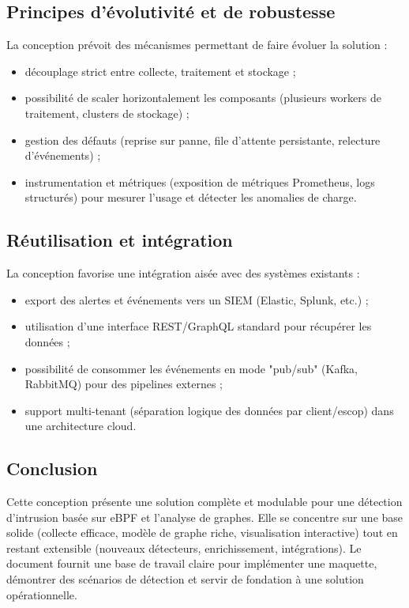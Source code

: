 \documentclass[a4paper,12pt]{article}
\begin{document}
\subsection{Principes d'évolutivité et de robustesse}

La conception prévoit des mécanismes permettant de faire évoluer la solution :

\begin{itemize}
  \item découplage strict entre collecte, traitement et stockage ;
  \item possibilité de scaler horizontalement les composants (plusieurs workers de traitement, clusters de stockage) ;
  \item gestion des défauts (reprise sur panne, file d'attente persistante, relecture d'événements) ;
  \item instrumentation et métriques (exposition de métriques Prometheus, logs structurés) pour mesurer l'usage et détecter les anomalies de charge.
\end{itemize}

\subsection{Réutilisation et intégration}

La conception favorise une intégration aisée avec des systèmes existants :

\begin{itemize}
  \item export des alertes et événements vers un SIEM (Elastic, Splunk, etc.) ;
  \item utilisation d'une interface REST/GraphQL standard pour récupérer les données ;
  \item possibilité de consommer les événements en mode "pub/sub" (Kafka, RabbitMQ) pour des pipelines externes ;
  \item support multi-tenant (séparation logique des données par client/escop) dans une architecture cloud.
\end{itemize}

\subsection{Conclusion}

Cette conception présente une solution complète et modulable pour une détection d'intrusion basée sur eBPF et l'analyse de graphes. Elle se concentre sur une base solide (collecte efficace, modèle de graphe riche, visualisation interactive) tout en restant extensible (nouveaux détecteurs, enrichissement, intégrations). Le document fournit une base de travail claire pour implémenter une maquette, démontrer des scénarios de détection et servir de fondation à une solution opérationnelle.
\end{document}
